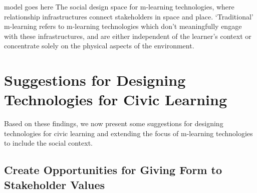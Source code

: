 model goes here
The social design space for m-learning technologies, where relationship infrastructures connect stakeholders in space and place. ‘Traditional’ m-learning refers to m-learning technologies which don’t meaningfully engage with these infrastructures, and are either independent of the learner’s context or concentrate solely on the physical aspects of the environment.

\section{Suggestions for Designing Technologies for Civic Learning}

Based on these findings, we now present some suggestions for designing technologies for civic learning and extending the focus of m-learning technologies to include the social context.

\subsection{Create Opportunities for Giving Form to Stakeholder Values}

